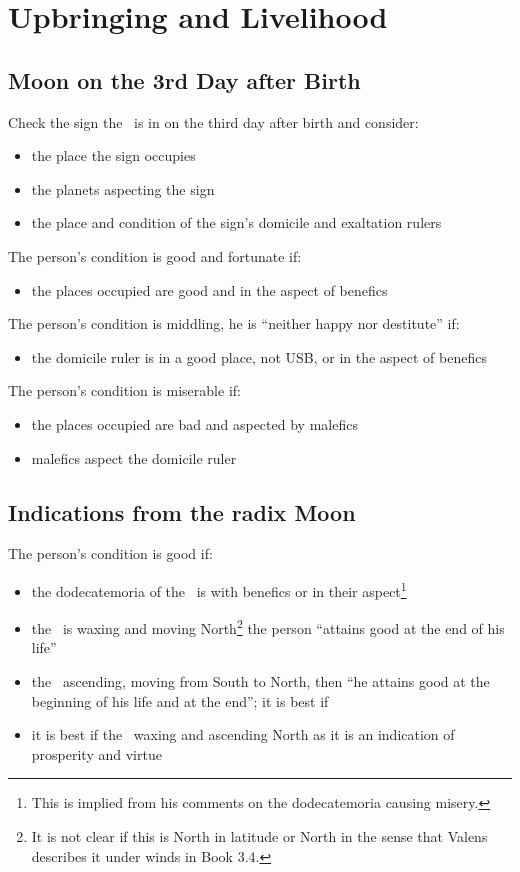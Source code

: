 \section{Upbringing and Livelihood}
\label{sec:upbringing4}
\subsection{Moon on the 3rd Day after Birth}
Check the sign the \Moon\, is in on the third day after birth and consider:
\begin{itemize}[topsep=0em,itemsep=0em]
\item the place the sign occupies
\item the planets aspecting the sign
\item the place and condition of the sign's domicile  and exaltation rulers
\end{itemize}

\noindent The person's condition is good and fortunate if:
\begin{itemize}[topsep=0em,itemsep=0em]
\item the places occupied are good and in the aspect of benefics
\end{itemize}

\noindent The person's condition is middling, he is ``neither happy nor destitute'' if:
\begin{itemize}[topsep=0em,itemsep=0em]
\item the domicile ruler is in a good place, not USB, or in the aspect of benefics
\end{itemize}

\noindent The person's condition is miserable if:
\begin{itemize}[topsep=0em,itemsep=0em]
\item the places occupied are bad and aspected by malefics
\item malefics aspect the domicile ruler
\end{itemize}

\subsection{Indications from the radix Moon}
The person's condition is good if:
\begin{itemize}[topsep=0em,itemsep=0em]
\item the dodecatemoria of the \Moon\, is with benefics or in their aspect\footnote{This is implied from his comments on the dodecatemoria causing misery.}

\item the \Moon\, is waxing and moving North\footnote{It is not clear if this is North in latitude or North in the sense that Valens describes it under winds in Book 3.4.} the person ``attains good at the end of his life''

\item the \Moon\, ascending, moving from South to North, then ``he attains good at the beginning of his life and at the end''; it is best if 

\item it is best if the \Moon\, waxing and ascending North as it is an indication of prosperity and virtue
\end{itemize}

